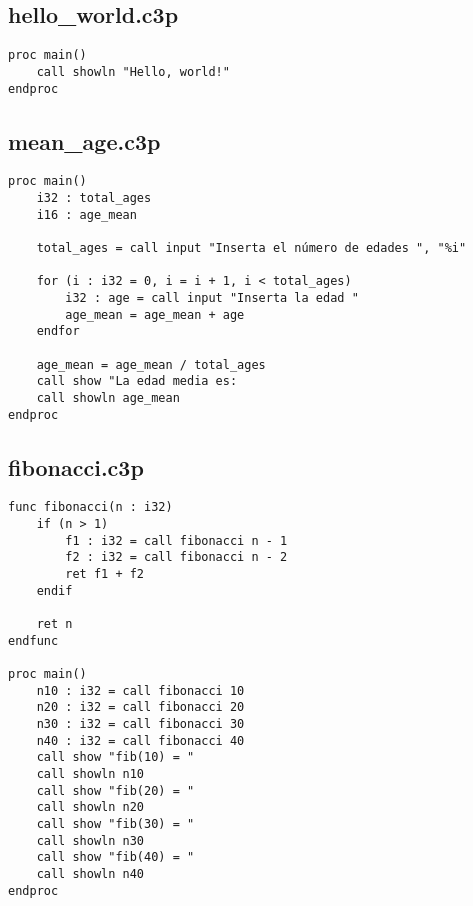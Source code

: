 \subsection{hello\_world.c3p}

\begin{verbatim}
proc main()
    call showln "Hello, world!"
endproc
\end{verbatim}

\subsection{mean\_age.c3p}
\begin{verbatim}
proc main()
    i32 : total_ages
    i16 : age_mean

    total_ages = call input "Inserta el número de edades ", "%i"

    for (i : i32 = 0, i = i + 1, i < total_ages)
        i32 : age = call input "Inserta la edad "
        age_mean = age_mean + age
    endfor

    age_mean = age_mean / total_ages
    call show "La edad media es:
    call showln age_mean
endproc
\end{verbatim}

\subsection{fibonacci.c3p}

\begin{verbatim}
func fibonacci(n : i32)
    if (n > 1)
        f1 : i32 = call fibonacci n - 1
        f2 : i32 = call fibonacci n - 2
        ret f1 + f2
    endif

    ret n
endfunc

proc main()
    n10 : i32 = call fibonacci 10
    n20 : i32 = call fibonacci 20
    n30 : i32 = call fibonacci 30
    n40 : i32 = call fibonacci 40
    call show "fib(10) = "
    call showln n10
    call show "fib(20) = "
    call showln n20
    call show "fib(30) = "
    call showln n30
    call show "fib(40) = "
    call showln n40
endproc
\end{verbatim}
